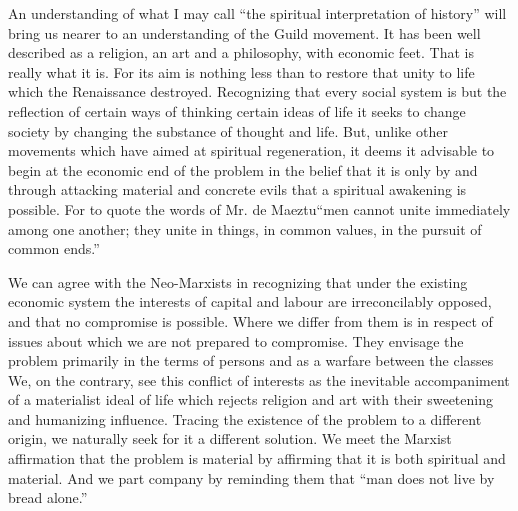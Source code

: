 \documentclass{book}
\begin{document}
An understanding of what I may call “the spiritual interpretation of history” will bring us nearer to an understanding of the Guild movement. It has been well described as a religion, an art and a philosophy, with economic feet. That is really what it is. For its aim is nothing less than to restore that unity to life which the Renaissance destroyed. Recognizing that every social system is but the reflection of certain ways of thinking certain ideas of life it seeks to change society by changing the substance of thought and life. But, unlike other movements which have aimed at spiritual regeneration, it deems it advisable to begin at the economic end of the problem in the belief that it is only by and through attacking material and concrete evils that a spiritual awakening is possible. For to quote the words of Mr. de Maeztu\footnotemark[3] “men cannot unite immediately among one another; they unite in things, in common values, in the pursuit of common ends.”

We can agree with the Neo-Marxists in recognizing that under the existing economic system the interests of capital and labour are irreconcilably opposed, and that no compromise is possible. Where we differ from them is in respect of issues about which we are not prepared to compromise. They envisage the problem primarily in the terms of persons and as a warfare between the classes We, on the contrary, see this conflict of interests as the inevitable accompaniment of a materialist ideal of life which rejects religion and art with their sweetening and humanizing influence. Tracing the existence of the problem to a different origin, we naturally seek for it a different solution. We meet the Marxist affirmation that the problem is material by affirming that it is both spiritual and material. And we part company by reminding them that “man does not live by bread alone.”
\end{document}
